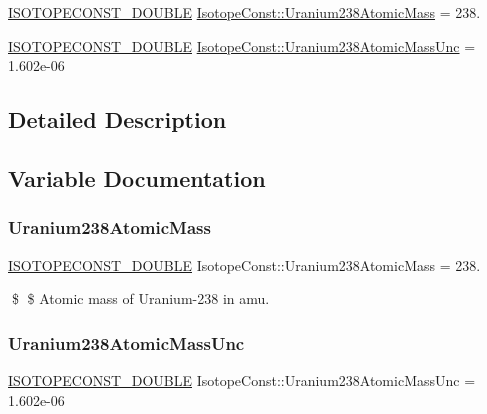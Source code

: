 \begin{DoxyCompactItemize}
\item 
\mbox{\hyperlink{group___isotope_const-_macros_ga8f45a7272ce02c0b4c65c44636ed719a}{I\+S\+O\+T\+O\+P\+E\+C\+O\+N\+S\+T\+\_\+\+D\+O\+U\+B\+LE}} \mbox{\hyperlink{group___isotope_const-_uranium-_u238_gad2ef12ba1b77e1a99436a7aeff1058b1}{Isotope\+Const\+::\+Uranium238\+Atomic\+Mass}} = 238.
\item 
\mbox{\hyperlink{group___isotope_const-_macros_ga8f45a7272ce02c0b4c65c44636ed719a}{I\+S\+O\+T\+O\+P\+E\+C\+O\+N\+S\+T\+\_\+\+D\+O\+U\+B\+LE}} \mbox{\hyperlink{group___isotope_const-_uranium-_u238_gae1dffb2c1303a2c558b94419328105b2}{Isotope\+Const\+::\+Uranium238\+Atomic\+Mass\+Unc}} = 1.\+602e-\/06
\end{DoxyCompactItemize}


\subsection{Detailed Description}


\subsection{Variable Documentation}
\mbox{\label{group___isotope_const-_uranium-_u238_gad2ef12ba1b77e1a99436a7aeff1058b1}} 
\subsubsection{\texorpdfstring{Uranium238\+Atomic\+Mass}{Uranium238AtomicMass}}
{\footnotesize\ttfamily \mbox{\hyperlink{group___isotope_const-_macros_ga8f45a7272ce02c0b4c65c44636ed719a}{I\+S\+O\+T\+O\+P\+E\+C\+O\+N\+S\+T\+\_\+\+D\+O\+U\+B\+LE}} Isotope\+Const\+::\+Uranium238\+Atomic\+Mass = 238.}

\$ \$ Atomic mass of Uranium-\/238 in amu. \mbox{\label{group___isotope_const-_uranium-_u238_gae1dffb2c1303a2c558b94419328105b2}} 
\subsubsection{\texorpdfstring{Uranium238\+Atomic\+Mass\+Unc}{Uranium238AtomicMassUnc}}
{\footnotesize\ttfamily \mbox{\hyperlink{group___isotope_const-_macros_ga8f45a7272ce02c0b4c65c44636ed719a}{I\+S\+O\+T\+O\+P\+E\+C\+O\+N\+S\+T\+\_\+\+D\+O\+U\+B\+LE}} Isotope\+Const\+::\+Uranium238\+Atomic\+Mass\+Unc = 1.\+602e-\/06}

